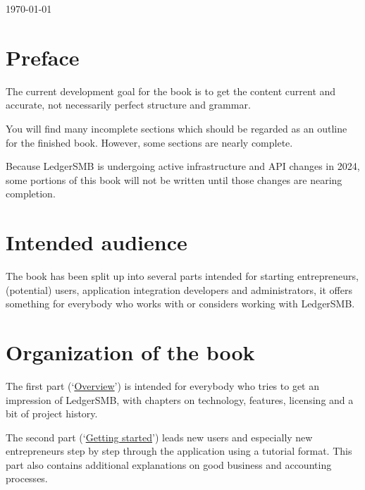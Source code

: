     \maketitle
    \begin{center}
    \today
    \end{center}

\fi

\tableofcontents

\listoffigures

\listoftables

\cleardoublepage

\section*{Preface}
\label{preface}

The current development goal for the book is to get the content current and accurate,
not necessarily perfect structure and grammar.

You will find many incomplete sections which should be regarded as an outline for the finished book.
However, some sections are nearly complete.

Because LedgerSMB is undergoing active infrastructure and API changes in 2024, some portions of this book will not be written until those changes are nearing completion.

\section*{Intended audience}
\label{sec-intended-audience}

The book has been split up into several parts intended for starting entrepreneurs,
(potential) users, application integration developers and
administrators, it offers something for everybody who works with or considers working with
LedgerSMB.

\section*{Organization of the book}
\label{sec-book-organization}

The first
part (\lq\hyperref[part-overview]{Overview}\rq) is intended for everybody who tries to get an impression of LedgerSMB, with
chapters on technology, features, licensing and a bit of project history.

The second part
(\lq\hyperref[part-getting-started]{Getting started}\rq) leads new users and especially new entrepreneurs step by step through the
application using a tutorial format. This part also contains additional explanations on good business and accounting
processes.


